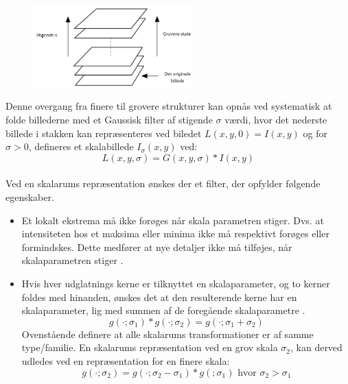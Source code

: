 \begin{figure}[H]
    \centering
    \includegraphics[width=0.55\textwidth]{fig/32.png}
     \vspace{-1em}
    \begin{center}    
       \caption{\textcolor{gray}{\footnotesize \textit{ }}}
    \label{fig:scalerep}
     \end{center}
     \vspace{-2.5em}
  \end{figure} \noindent
Denne overgang fra finere til grovere strukturer kan opnås ved systematisk at folde billederne med et Gaussisk filter af stigende $\sigma$ værdi, hvor det nederste billede i stakken kan repræsenteres ved biledet $ L(x,y,0) = I(x,y)$ og for $\sigma>0$, defineres et skalabillede $I_\sigma(x,y)$ ved:
\begin{equation}
L(x,y,\sigma) = G(x,y,\sigma)\ast I(x,y)
\label{scalespace1}
\end{equation}
\\
Ved en skalarums repræsentation ønskes der et filter, der opfylder følgende egenskaber.
\begin{itemize}
\item{Et lokalt ekstrema må ikke forøges når skala parametren stiger. Dvs. at intensiteten hos et maksima eller minima ikke må respektivt forøges eller formindskes. Dette medfører at nye detaljer ikke må tilføjes, når skalaparametren stiger \cite{lindkth}.}
\item{Hvis hver udglatnings kerne er tilknyttet en skalaparameter, og to kerner foldes med hinanden, ønskes det at den resulterende kerne har en skalaparameter, lig med summen af de foregående skalaparametre \cite{springer}.
\begin{equation}
g(\cdot;\sigma_1) \ast g(\cdot;\sigma_2)=g(\cdot;\sigma_1+\sigma_2)
\label{semi}
\end{equation}
Ovenstående definere at alle skalarums transformationer er af samme type/familie. En skalarums repræsentation ved en grov skala $\sigma_2$, kan derved udledes ved en repræsentation for en finere skala:
\begin{equation}
g(\cdot;\sigma_2) = g(\cdot;\sigma_2-\sigma_1)\ast g(;\sigma_1)\text{     hvor     }\sigma_2>\sigma_1
\end{equation}}
\end{itemize}
